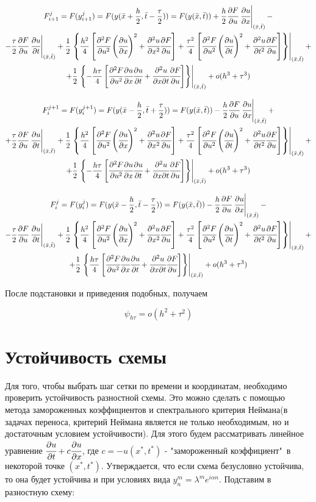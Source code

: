 \documentclass[12pt]{article}
\def\dd#1#2{\cfrac{\partial#1}{\partial#2}}
\def\ddd#1#2#3{\cfrac{\partial^2#1}{\partial#2\partial#3}}
\def\dddd#1#2{\cfrac{\partial^2#1}{\partial{#2}^2}}
\def \atxt#1{\left.#1\right|_{(\bar{x},\bar{t})}}
\begin{document}
		\begin{multline}
			F^{j}_{i+1} = F(y^{j}_{i+1}) = F(y(\bar{x} + \frac{h}{2}, \bar{t} - \frac{\tau}{2})) =  F(y(\bar{x}, \bar{t})) + \frac{h}{2}\dd{F}u\atxt{\dd{u}x} - \\
			-\frac{\tau}{2}\dd{F}u\atxt{\dd{u}t} + \frac{1}{2}\atxt{\left\{ \frac{h^2}{4}\left[ \dddd{F}u \left( \dd{u}x\right)^2 + \dddd{u}x\dd{F}u \right] + \frac{\tau^2}{4}\left[ \dddd{F}u\left( \dd{u}t \right)^2 + \dddd{u}t\dd{F}u \right] \right\}}+\\
			+ \frac{1}{2}\atxt{\left\{ -\frac{h\tau}{4}\left[ \dddd{F}u\dd{u}x\dd{u}t + \ddd{u}{x}t\dd{F}u \right] \right\}} + o(h^3 + \tau^3)
		\end{multline}

		\begin{multline}
			F^{j+1}_{i} = F(y^{j+1}_{i}) = F(y(\bar{x} - \frac{h}{2}, \bar{t} + \frac{\tau}{2})) =  F(y(\bar{x}, \bar{t})) - \frac{h}{2}\dd{F}u\atxt{\dd{u}x} + \\
			+\frac{\tau}{2}\dd{F}u\atxt{\dd{u}t} + \frac{1}{2}\atxt{\left\{ \frac{h^2}{4}\left[ \dddd{F}u \left( \dd{u}x\right)^2 + \dddd{u}x\dd{F}u \right] + \frac{\tau^2}{4}\left[ \dddd{F}u\left( \dd{u}t \right)^2 + \dddd{u}t\dd{F}u \right] \right\}}+\\
			+ \frac{1}{2}\atxt{\left\{ -\frac{h\tau}{4}\left[ \dddd{F}u\dd{u}x\dd{u}t + \ddd{u}{x}t\dd{F}u \right] \right\}} + o(h^3 + \tau^3)
		\end{multline}
		
		\begin{multline}
			F^{j}_{i} = F(y^{j}_{i}) = F(y(\bar{x} - \frac{h}{2}, \bar{t} - \frac{\tau}{2})) =  F(y(\bar{x}, \bar{t})) - \frac{h}{2}\dd{F}u\atxt{\dd{u}x} - \\
			-\frac{\tau}{2}\dd{F}u\atxt{\dd{u}t} + \frac{1}{2}\atxt{\left\{ \frac{h^2}{4}\left[ \dddd{F}u \left( \dd{u}x\right)^2 + \dddd{u}x\dd{F}u \right] + \frac{\tau^2}{4}\left[ \dddd{F}u\left( \dd{u}t \right)^2 + \dddd{u}t\dd{F}u \right] \right\}}+\\
			+ \frac{1}{2}\atxt{\left\{ \frac{h\tau}{4}\left[ \dddd{F}u\dd{u}x\dd{u}t + \ddd{u}{x}t\dd{F}u \right] \right\}} + o(h^3 + \tau^3)
		\end{multline}
		
		После подстановки и приведения подобных, получаем
		
		$$\psi_{h\tau} = o(h^2+\tau^2)$$
		
	\section{Устойчивость схемы}
		Для того, чтобы выбрать шаг сетки по времени и координатам, необходимо проверить устойчивость разностной схемы. Это можно сделать с помощью метода замороженных коэффициентов и спектрального критерия Неймана(в задачах переноса, критерий Неймана является не только необходимым, но и достаточным условием устойчивости). Для этого будем рассматривать линейное уравнение $\dd{u}t + c\dd{u}x$, где $c = -u(x^*,t^*)$ - "замороженный коэффициент"\ в некоторой точке $(x^*,t^*)$. Утверждается, что если схема безусловно устойчива, то она будет устойчива и при условиях вида $y^m_n = \lambda^m e^{i\alpha n}$. Подставим в разностную схему:
		
\end{document}
